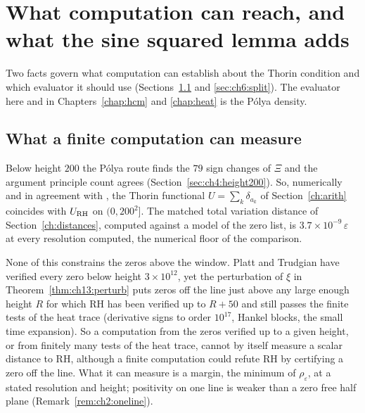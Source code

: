 \section{What computation can reach, and what the sine squared lemma adds}\label{ch:motivation}
\label{sec:motivation}

Two facts govern what computation can establish about the Thorin condition and which evaluator it should use (Sections~\ref{sec:ch6:measure} and \ref{sec:ch6:split}). The evaluator here and in Chapters~\ref{chap:hcm} and \ref{chap:heat} is the P\'olya density.

\subsection{What a finite computation can measure}\label{sec:ch6:measure}

Below height $200$ the P\'olya route finds the $79$ sign changes of $\Xi$ and the argument principle count agrees (Section~\ref{sec:ch4:height200}). So, numerically and in agreement with \cite{Backlund,PT21}, the Thorin functional $U=\sum_k\delta_{a_k}$ of Section~\ref{ch:arith} coincides with $U_{\mathrm{RH}}$ on $(0,200^2]$. The matched total variation distance of Section~\ref{ch:distances}, computed against a model of the zero list, is $3.7\times10^{-9}\,\varepsilon$ at every resolution computed, the numerical floor of the comparison.

None of this constrains the zeros above the window. Platt and Trudgian \cite{PT21} have verified every zero below height $3\times10^{12}$, yet the perturbation of $\xi$ in Theorem~\ref{thm:ch13:perturb} \cite[Chapter 11]{P26} puts zeros off the line just above any large enough height $R$ for which RH has been verified up to $R+50$ and still passes the finite tests of the heat trace (derivative signs to order $10^{17}$, Hankel blocks, the small time expansion). So a computation from the zeros verified up to a given height, or from finitely many tests of the heat trace, cannot by itself measure a scalar distance to RH, although a finite computation could refute RH by certifying a zero off the line. What it can measure is a margin, the minimum of $\rho_\varepsilon$, at a stated resolution and height; positivity on one line is weaker than a zero free half plane (Remark~\ref{rem:ch2:oneline}).

